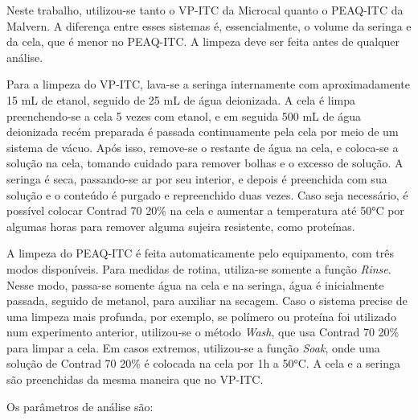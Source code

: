 		Neste trabalho, utilizou-se tanto o VP-ITC da Microcal quanto o PEAQ-ITC da Malvern. A diferença entre esses sistemas é, essencialmente, o volume da seringa e da cela, que é menor no PEAQ-ITC. A limpeza deve ser feita antes de qualquer análise.
		
		Para a limpeza do VP-ITC, lava-se a seringa internamente com aproximadamente 15 mL de etanol, seguido de 25 mL de água deionizada. A cela é limpa preenchendo-se a cela 5 vezes com etanol, e em seguida 500 mL de água deionizada recém preparada é passada continuamente pela cela por meio de um sistema de vácuo. Após isso, remove-se o restante de água na cela, e coloca-se a solução na cela, tomando cuidado para remover bolhas e o excesso de solução. A seringa é seca, passando-se ar por seu interior, e depois é preenchida com sua solução e o conteúdo é purgado e repreenchido duas vezes. Caso seja necessário, é possível colocar Contrad 70 20\% na cela e aumentar a temperatura até 50°C por algumas horas para remover alguma sujeira resistente, como proteínas.
		
		A limpeza do PEAQ-ITC é feita automaticamente pelo equipamento, com três modos disponíveis. Para medidas de rotina, utiliza-se somente a função \emph{Rinse}. Nesse modo, passa-se somente água na cela e na seringa, água é inicialmente passada, seguido de metanol, para auxiliar na secagem. Caso o sistema precise de uma limpeza mais profunda, por exemplo, se polímero ou proteína foi utilizado num experimento anterior, utilizou-se o método \emph{Wash}, que usa Contrad 70 20\% para limpar a cela. Em casos extremos, utilizou-se a função \emph{Soak}, onde uma solução de Contrad 70 20\% é colocada na cela por 1h a 50°C. A cela e a seringa são preenchidas da mesma maneira que no VP-ITC.
		
		Os parâmetros de análise são: %
		
